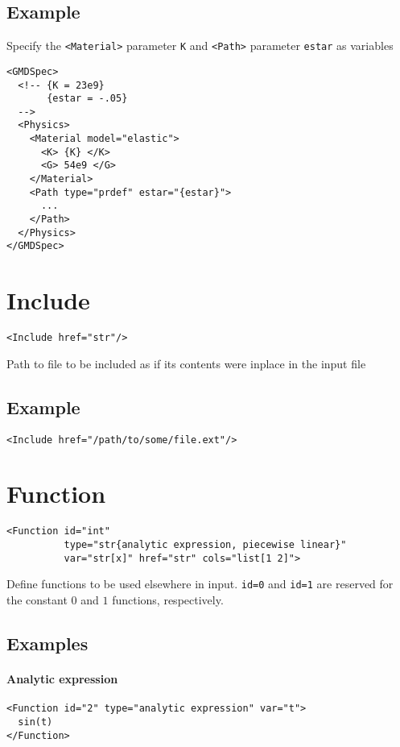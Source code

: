 \documentclass[11pt]{report}
\newcommand{\tag}[1]{\texttt{<#1>}}
\begin{document}
\subsection{Example}
Specify the \tag{Material} parameter \texttt{K} and \tag{Path} parameter
\texttt{estar} as variables
\begin{verbatim}
<GMDSpec>
  <!-- {K = 23e9}
       {estar = -.05}
  -->
  <Physics>
    <Material model="elastic">
      <K> {K} </K>
      <G> 54e9 </G>
    </Material>
    <Path type="prdef" estar="{estar}">
      ...
    </Path>
  </Physics>
</GMDSpec>
\end{verbatim}

\section{Include}
\begin{verbatim}
<Include href="str"/>
\end{verbatim}
%
Path to file to be included as if its contents were inplace in the input file

\subsection{Example}
\begin{verbatim}
<Include href="/path/to/some/file.ext"/>
\end{verbatim}

\section{Function}
\begin{verbatim}
<Function id="int"
          type="str{analytic expression, piecewise linear}"
          var="str[x]" href="str" cols="list[1 2]">
\end{verbatim}
%
Define functions to be used elsewhere in input. \texttt{id=0} and
\texttt{id=1} are reserved for the constant $0$ and $1$ functions,
respectively.

\subsection{Examples}
\paragraph{Analytic expression}
%
\begin{verbatim}
<Function id="2" type="analytic expression" var="t">
  sin(t)
</Function>
\end{verbatim}
\end{document}
